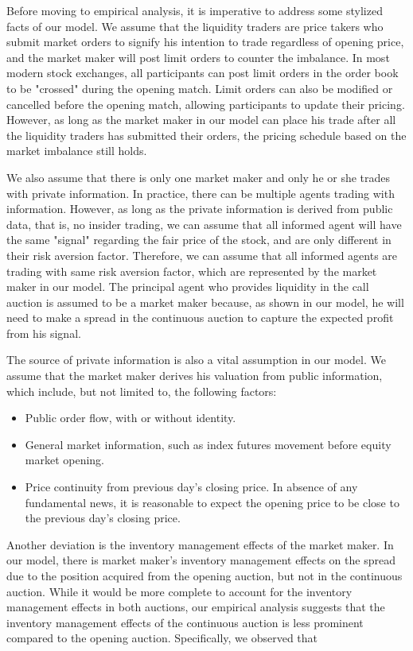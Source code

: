 Before moving to empirical analysis, it is imperative to address some stylized facts of our model. We assume that the liquidity traders are price takers who submit market orders to signify his intention to trade regardless of opening price, and the market maker will post limit orders to counter the imbalance. In most modern stock exchanges, all participants can post limit orders in the order book to be "crossed" during the opening match. Limit orders can also be modified or cancelled before the opening match, allowing participants to update their pricing. However, as long as the market maker in our model can place his trade after all the liquidity traders has submitted their orders, the pricing schedule based on the market imbalance still holds.

We also assume that there is only one market maker and only he or she trades with private information. In practice, there can be multiple agents trading with information. However, as long as the private information is derived from public data, that is, no insider trading, we can assume that all informed agent will have the same "signal" regarding the fair price of the stock, and are only different in their risk aversion factor. Therefore, we can assume that all informed agents are trading with same risk aversion factor, which are represented by the market maker in our model. The principal agent who provides liquidity in the call auction is assumed to be a market maker because, as shown in our model, he will need to make a spread in the continuous auction to capture the expected profit from his signal.

The source of private information is also a vital assumption in our model. We assume that the market maker derives his valuation from public information, which include, but not limited to, the following factors:

\begin{itemize}
  \item Public order flow, with or without identity.
  \item General market information, such as index futures movement before equity market opening.
  \item Price continuity from previous day's closing price. In absence of any fundamental news, it is reasonable to expect the opening price to be close to the previous day's closing price.
\end{itemize}

Another deviation is the inventory management effects of the market maker. In our model, there is market maker's inventory management effects on the spread due to the position acquired from the opening auction, but not in the continuous auction. While it would be more complete to account for the inventory management effects in both auctions, our empirical analysis suggests that the inventory management effects of the continuous auction is less prominent compared to the opening auction. Specifically, we observed that

